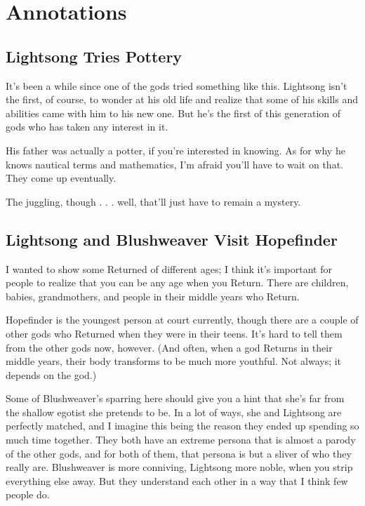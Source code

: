 \section*{Annotations}

\subsection*{Lightsong Tries Pottery}

It’s been a while since one of the gods tried something like this. Lightsong isn’t the first, of course, to wonder at his old life and realize that some of his skills and abilities came with him to his new one. But he’s the first of this generation of gods who has taken any interest in it.

His father was actually a potter, if you’re interested in knowing. As for why he knows nautical terms and mathematics, I’m afraid you’ll have to wait on that. They come up eventually.

The juggling, though . . . well, that’ll just have to remain a mystery.

\subsection*{Lightsong and Blushweaver Visit Hopefinder}

I wanted to show some Returned of different ages; I think it’s important for people to realize that you can be any age when you Return. There are children, babies, grandmothers, and people in their middle years who Return.

Hopefinder is the youngest person at court currently, though there are a couple of other gods who Returned when they were in their teens. It’s hard to tell them from the other gods now, however. (And often, when a god Returns in their middle years, their body transforms to be much more youthful. Not always; it depends on the god.)

Some of Blushweaver’s sparring here should give you a hint that she’s far from the shallow egotist she pretends to be. In a lot of ways, she and Lightsong are perfectly matched, and I imagine this being the reason they ended up spending so much time together. They both have an extreme persona that is almost a parody of the other gods, and for both of them, that persona is but a sliver of who they really are. Blushweaver is more conniving, Lightsong more noble, when you strip everything else away. But they understand each other in a way that I think few people do.



